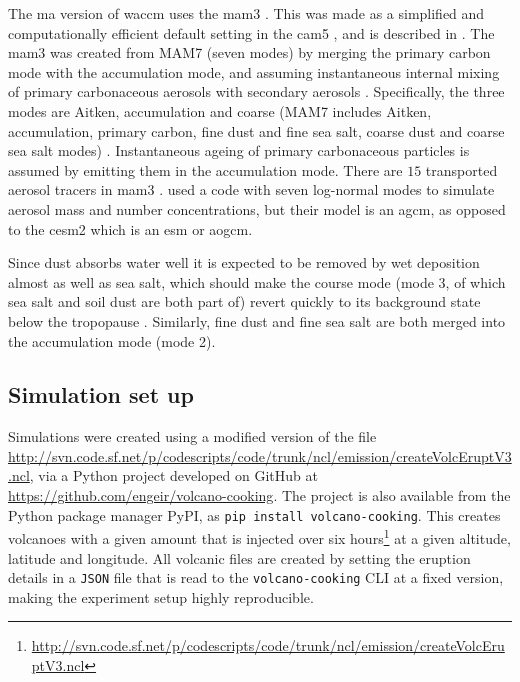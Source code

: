 \documentclass{ametsocV5}
\begin{document}

The \acrshort{ma} version of \acrshort{waccm} uses the \acrfull{mam3}
\citep{gettleman2019}. This was made as a simplified and computationally efficient
default setting in the \acrshort{cam5} \citep{liu2016}, and is described in
\citet{liu2012}. The \acrshort{mam3} was created from MAM7 (seven modes) by merging the
primary carbon mode with the accumulation mode, and assuming instantaneous internal
mixing of primary carbonaceous aerosols with secondary aerosols \citep{liu2016}.
Specifically, the three modes are Aitken, accumulation and coarse (MAM7 includes Aitken,
accumulation, primary carbon, fine dust and fine sea salt, coarse dust and coarse sea
salt modes) \citep{liu2016}. Instantaneous ageing of primary carbonaceous particles is
assumed by emitting them in the accumulation mode. There are \(15\) transported aerosol
tracers in \acrshort{mam3} \citep{liu2016}. \citet{marshall2019, marshall2020,
  marshall2021} used a code with seven log-normal modes to simulate aerosol mass and
number concentrations, but their model is an \acrfull{agcm}, as opposed to the
\acrshort{cesm2} which is an \acrfull{esm} or \acrfull{aogcm}.

Since dust absorbs water well it is expected to be removed by wet deposition almost as
well as sea salt, which should make the course mode (mode 3, of which sea salt and soil
dust are both part of) revert quickly to its background state below the tropopause
\citep{liu2012}. Similarly, fine dust and fine sea salt are both merged into the
accumulation mode (mode 2).


\subsection{Simulation set up}

Simulations were created using a modified version of the file
\url{http://svn.code.sf.net/p/codescripts/code/trunk/ncl/emission/createVolcEruptV3.ncl},
via a Python project developed on GitHub at
\url{https://github.com/engeir/volcano-cooking}. The project is also available from the
Python package manager PyPI, as \texttt{pip install volcano-cooking}. This creates
volcanoes with a given  amount that is injected over six
hours\footnote{\url{http://svn.code.sf.net/p/codescripts/code/trunk/ncl/emission/createVolcEruptV3.ncl}}
at a given altitude, latitude and longitude. All volcanic  files are created by
setting the eruption details in a \texttt{JSON} file that is read to the
\texttt{volcano-cooking} CLI at a fixed version, making the experiment setup highly
reproducible.
\end{document}
